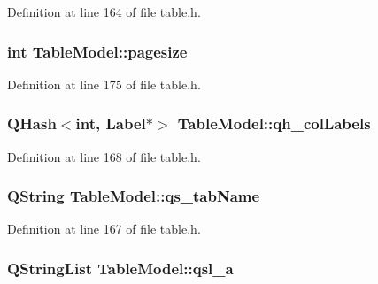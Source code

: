 Definition at line 164 of file table.h.

\hypertarget{classTableModel_ab9dfb638330390087383eb9373c3d419}{
\subsubsection[{pagesize}]{\setlength{\rightskip}{0pt plus 5cm}int {\bf TableModel::pagesize}}}
\label{classTableModel_ab9dfb638330390087383eb9373c3d419}


Definition at line 175 of file table.h.

\hypertarget{classTableModel_a5a5e432aac68a716c4bf1849d821a846}{
\subsubsection[{qh\_\-colLabels}]{\setlength{\rightskip}{0pt plus 5cm}QHash$<$int, {\bf Label}$\ast$$>$ {\bf TableModel::qh\_\-colLabels}}}
\label{classTableModel_a5a5e432aac68a716c4bf1849d821a846}


Definition at line 168 of file table.h.

\hypertarget{classTableModel_a3cf9e7d2a7d75f156247d572df42d669}{
\subsubsection[{qs\_\-tabName}]{\setlength{\rightskip}{0pt plus 5cm}QString {\bf TableModel::qs\_\-tabName}}}
\label{classTableModel_a3cf9e7d2a7d75f156247d572df42d669}


Definition at line 167 of file table.h.

\hypertarget{classTableModel_ae2d3fd99f245025a7078671bb8b42225}{
\subsubsection[{qsl\_\-a}]{\setlength{\rightskip}{0pt plus 5cm}QStringList {\bf TableModel::qsl\_\-a}}}
\label{classTableModel_ae2d3fd99f245025a7078671bb8b42225}


